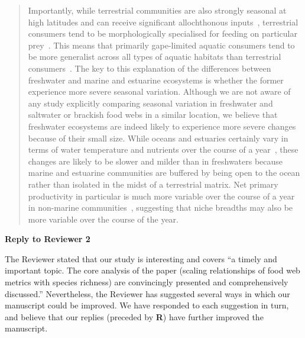 \documentclass[12pt]{letter}
\begin{document}
\begin{quotation}
    Importantly, while terrestrial communities are also 
    strongly seasonal at high latitudes and can receive 
    significant allochthonous inputs~\cite{Nakano2001}, 
    terrestrial consumers tend to be morphologically 
    specialised for feeding on particular 
    prey~\cite{Liem1990}. This means that primarily 
    gape-limited aquatic consumers tend to be more
    generalist across all types of aquatic habitats than 
    terrestrial consumers~\cite{Liem1990,Shurin2006}. The
    key to this explanation of the differences between 
    freshwater and marine and estuarine  ecosystems is 
    whether the former experience more severe seasonal 
    variation. Although we are not aware of any study 
    explicitly comparing seasonal variation in freshwater 
    and saltwater or brackish food webs in a similar 
    location, we believe that freshwater ecosystems are 
    indeed likely to  experience more severe changes 
    because of their small size. While oceans and estuaries 
    certainly vary in terms of water temperature and
    nutrients over the course of a year~\cite{Baird1989}, 
    these changes are likely to be slower and milder than 
    in freshwaters because marine and estuarine communities 
    are buffered by being open to the ocean rather than 
    isolated in the midst of a terrestrial matrix. Net 
    primary productivity in particular is much more 
    variable over the course of a year in non-marine 
    communities~\cite{Field1998}, suggesting that niche 
    breadths may also be more variable over the course of 
    the year.

  \end{quotation}


  \newpage

{\Large \bf Reply to Reviewer 2}

  The Reviewer stated that our study is interesting and covers ``a timely and
  important topic. The core analysis of the paper (scaling relationships of
  food web metrics with species richness) are convincingly presented and
  comprehensively discussed.'' Nevertheless, the Reviewer has suggested several
  ways in which our manuscript could be improved. We have responded to each suggestion
  in turn, and believe that our replies (preceded by \textbf{R}) have further improved
  the manuscript.


\end{document}
